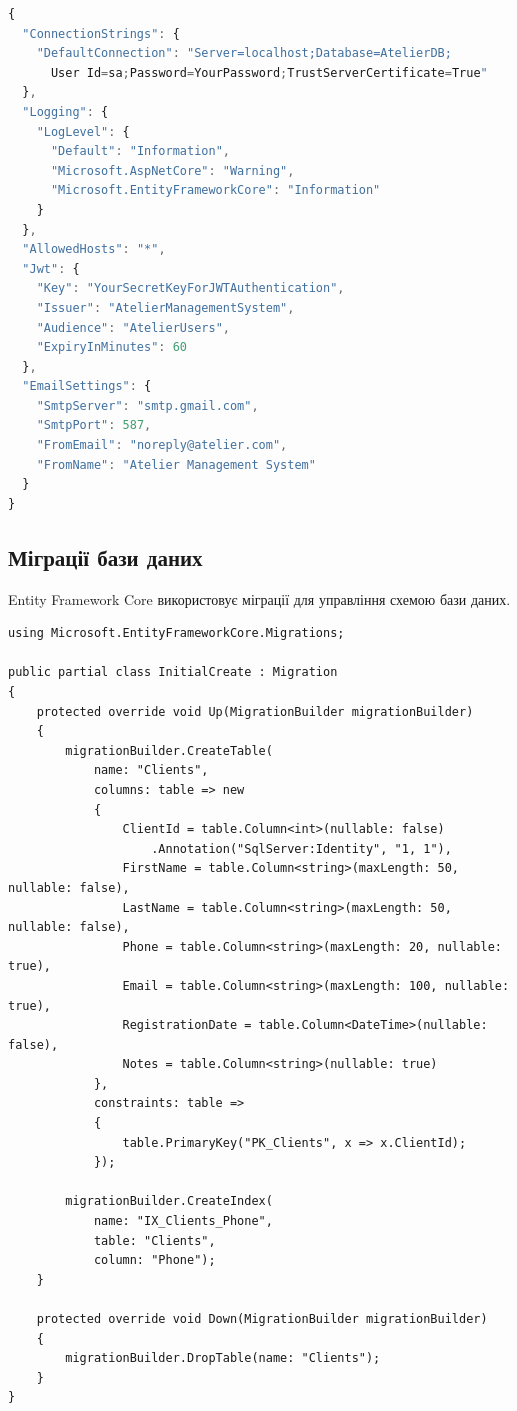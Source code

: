 \documentclass[14pt,a4paper]{extarticle}
\begin{document}
\begin{lstlisting}[language=JavaScript, caption=appsettings.json, basicstyle=\small\ttfamily, breaklines=true, frame=single]
{
  "ConnectionStrings": {
    "DefaultConnection": "Server=localhost;Database=AtelierDB;
      User Id=sa;Password=YourPassword;TrustServerCertificate=True"
  },
  "Logging": {
    "LogLevel": {
      "Default": "Information",
      "Microsoft.AspNetCore": "Warning",
      "Microsoft.EntityFrameworkCore": "Information"
    }
  },
  "AllowedHosts": "*",
  "Jwt": {
    "Key": "YourSecretKeyForJWTAuthentication",
    "Issuer": "AtelierManagementSystem",
    "Audience": "AtelierUsers",
    "ExpiryInMinutes": 60
  },
  "EmailSettings": {
    "SmtpServer": "smtp.gmail.com",
    "SmtpPort": 587,
    "FromEmail": "noreply@atelier.com",
    "FromName": "Atelier Management System"
  }
}
\end{lstlisting}

\subsection{Міграції бази даних}

Entity Framework Core використовує міграції для управління схемою бази даних.

\begin{lstlisting}[language={[Sharp]C}, caption=Початкова міграція, basicstyle=\small\ttfamily, breaklines=true, frame=single]
using Microsoft.EntityFrameworkCore.Migrations;

public partial class InitialCreate : Migration
{
    protected override void Up(MigrationBuilder migrationBuilder)
    {
        migrationBuilder.CreateTable(
            name: "Clients",
            columns: table => new
            {
                ClientId = table.Column<int>(nullable: false)
                    .Annotation("SqlServer:Identity", "1, 1"),
                FirstName = table.Column<string>(maxLength: 50, nullable: false),
                LastName = table.Column<string>(maxLength: 50, nullable: false),
                Phone = table.Column<string>(maxLength: 20, nullable: true),
                Email = table.Column<string>(maxLength: 100, nullable: true),
                RegistrationDate = table.Column<DateTime>(nullable: false),
                Notes = table.Column<string>(nullable: true)
            },
            constraints: table =>
            {
                table.PrimaryKey("PK_Clients", x => x.ClientId);
            });
            
        migrationBuilder.CreateIndex(
            name: "IX_Clients_Phone",
            table: "Clients",
            column: "Phone");
    }
    
    protected override void Down(MigrationBuilder migrationBuilder)
    {
        migrationBuilder.DropTable(name: "Clients");
    }
}
\end{lstlisting}
\end{document}
